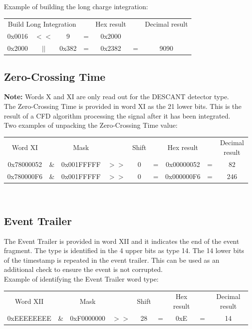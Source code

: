 \documentclass[letterpaper,12pt,notitlepage]{report}
\begin{document}
Example of building the long charge integration:\\

\begin{tabular}{ccccccc}
\multicolumn{3}{c}{Build Long Integration} & & Hex result & & Decimal result\\
0x0016 & $<<$ & 9 & = & 0x2000\\
0x2000 & $||$ & 0x382 & = & 0x2382 & = & 9090\\
\end{tabular}

\subsection{Zero-Crossing Time}
{\bf Note:} Words X and XI are only read out for the DESCANT detector type.\\

The Zero-Crossing Time is provided in word XI as the 21 lower bits. This is the result of a CFD algorithm processing the signal after it has been integrated.\\

Two examples of unpacking the Zero-Crossing Time value:\\

\begin{tabular}{ccccccccc}
Word XI &  & Mask & & Shift & & Hex result & & Decimal result\\
0x78000052 & \& & 0x001FFFFF & $>>$ & 0 & = & 0x00000052 & = & 82\\
0x780000F6 & \& & 0x001FFFFF & $>>$ & 0 & = & 0x000000F6 & = & 246\\
\end{tabular}\\

\subsection{Event Trailer}
The Event Trailer is provided in word XII and it indicates the end of the event fragment. The type is identified in the 4 upper bits as type 14. The 14 lower bits of the timestamp is repeated in the event trailer. This can be used as an additional check to ensure the event is not corrupted.\\

Example of identifying the Event Trailer word type:\\

\begin{tabular}{ccccccccc}
Word XII &  & Mask & & Shift & & Hex result & & Decimal result\\
0xEEEEEEEE & \& & 0xF0000000 & $>>$ & 28 & = & 0xE & = & 14\\
\end{tabular}
\end{document}

